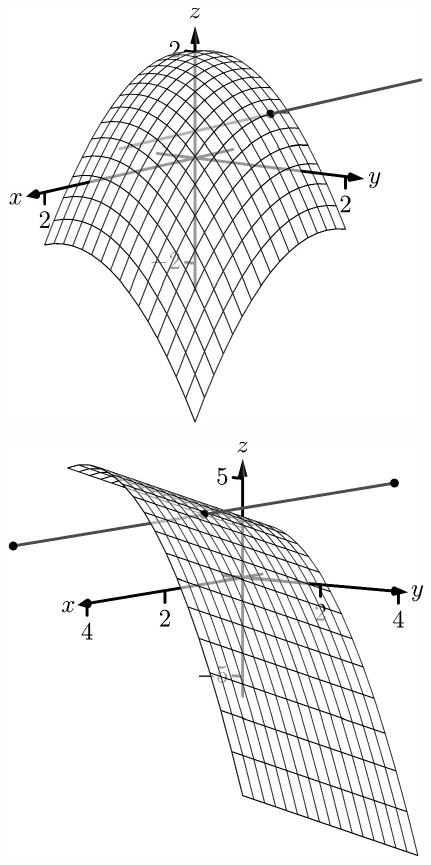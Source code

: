 \documentclass[10pt]{article}
\begin{document}
\includegraphics{figtp13_3DBW.pdf}
\texttt{}

\includegraphics{figtp15_3DBW.pdf}
\texttt{}
\end{document}
